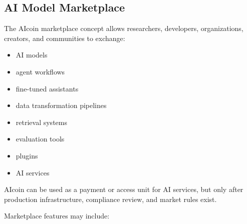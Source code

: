 ﻿\documentclass[12pt]{article}
\begin{document}
\subsection{AI Model Marketplace}


The AIcoin marketplace concept allows researchers, developers, organizations, creators, and communities to exchange:

\begin{itemize}
  \item AI models
\end{itemize}
\begin{itemize}
  \item agent workflows
\end{itemize}
\begin{itemize}
  \item fine-tuned assistants
\end{itemize}
\begin{itemize}
  \item data transformation pipelines
\end{itemize}
\begin{itemize}
  \item retrieval systems
\end{itemize}
\begin{itemize}
  \item evaluation tools
\end{itemize}
\begin{itemize}
  \item plugins
\end{itemize}
\begin{itemize}
  \item AI services
\end{itemize}

AIcoin can be used as a payment or access unit for AI services, but only after production infrastructure, compliance review, and market rules exist.

Marketplace features may include:
\end{document}
